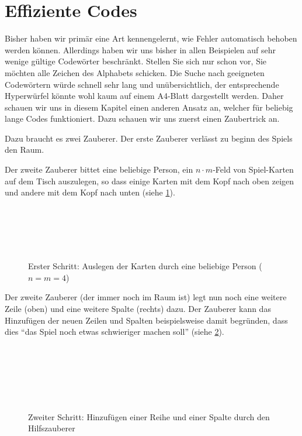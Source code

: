 \section{Effiziente Codes}

Bisher haben wir primär eine Art kennengelernt, wie Fehler automatisch behoben werden können. Allerdings haben wir uns bisher in allen Beispielen auf sehr wenige gültige Codewörter beschränkt. Stellen Sie sich nur schon vor, Sie möchten alle Zeichen des Alphabets schicken. Die Suche nach geeigneten Codewörtern würde schnell sehr lang und unübersichtlich, der entsprechende Hyperwürfel könnte wohl kaum auf einem A4-Blatt dargestellt werden. Daher schauen wir uns in diesem Kapitel einen anderen Ansatz an, welcher für beliebig lange Codes funktioniert. Dazu schauen wir uns zuerst einen Zaubertrick an.

Dazu braucht es zwei Zauberer. Der erste Zauberer verlässt zu beginn des Spiels den Raum.

Der zweite Zauberer bittet eine beliebige Person, ein $n\cdot m$-Feld von Spiel-Karten auf dem Tisch auszulegen, so dass einige Karten mit dem Kopf nach oben zeigen und andere mit dem Kopf nach unten (siehe \cref{fig:zauberer-1}).

\begin{figure}[H]
    \centering
    \\
    \\
    \\
    \\
    \caption{Erster Schritt: Auslegen der Karten durch eine beliebige Person ($n=m=4$)}
    \label{fig:zauberer-1}
\end{figure}


Der zweite Zauberer (der immer noch im Raum ist) legt nun noch eine weitere Zeile (oben) und eine weitere Spalte (rechts) dazu. Der Zauberer kann das Hinzufügen der neuen Zeilen und Spalten beispielsweise damit begründen, dass dies \enquote{das Spiel noch etwas schwieriger machen soll} (siehe \cref{fig:zauberer-2}).

\begin{figure}[H]
    \centering
    \\
    \\
    \\
    \\
    \\
    \caption{Zweiter Schritt: Hinzufügen einer Reihe und einer Spalte durch den Hilfszauberer}
    \label{fig:zauberer-2}
\end{figure}

